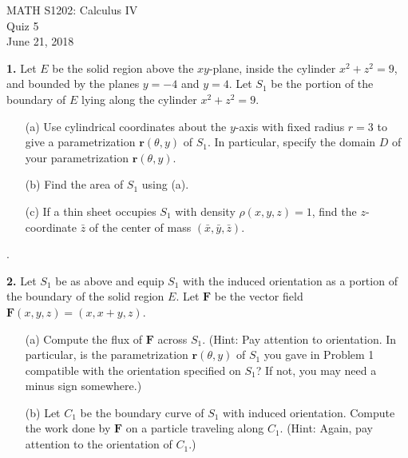 \documentclass{article}
\begin{document}
\begin{center}
MATH S1202: Calculus IV \\ 
Quiz 5 \\
June 21, 2018
\end{center}

\noindent 

\vspace{3mm}


\noindent \textbf{1.} Let $E$ be the solid region above the $xy$-plane, inside the cylinder $x^2 + z^2 = 9$, and bounded by the planes $y = -4$ and $y = 4$.  Let $S_1$ be the portion of the boundary of $E$ lying along the cylinder $x^2 + z^2 = 9$.

\begin{enumerate}
\item[(a)] Use cylindrical coordinates about the $y$-axis with fixed radius $r = 3$ to give a parametrization $\mathbf{r}(\theta, y)$ of $S_1$. In particular, specify the domain $D$ of your parametrization $\mathbf{r}(\theta, y)$. 
\item[(b)] Find the area of $S_1$ using (a). 
\item[(c)]  If a thin sheet occupies $S_1$ with density $\rho(x,y,z) = 1$, find the $z$-coordinate $\bar{z}$ of the center of mass $(\bar{x}, \bar{y}, \bar{z})$. 
\end{enumerate} .


\vspace{3mm}

\noindent \textbf{2.} Let $S_1$ be as above and equip $S_1$ with the induced orientation as a portion of the boundary of the solid region $E$. Let $\mathbf{F}$ be the vector field $\mathbf{F}(x,y,z) = (x, x+y, z)$. 
\begin{enumerate}
\item[(a)] Compute the flux of $\mathbf{F}$ across $S_1$. (Hint: Pay attention to orientation. In particular, is the parametrization $\mathbf{r}(\theta, y)$ of $S_1$ you gave in Problem 1 compatible with the orientation specified on $S_1$? If not, you may need a minus sign somewhere.) 
\item[(b)] Let $C_1$ be the boundary curve of $S_1$ with induced orientation. Compute the work done by $\mathbf{F}$ on a particle traveling along $C_1$. (Hint: Again, pay attention to the orientation of $C_1$.)
\end{enumerate}
\end{document}
